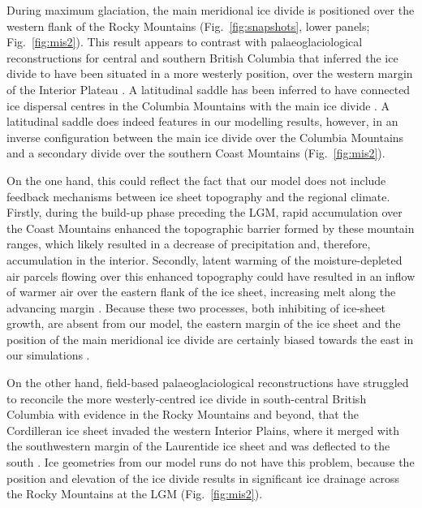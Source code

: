 \documentclass[tc, manuscript]{copernicus}
\begin{document}
During maximum glaciation, the main meridional ice divide is positioned over
the western flank of the Rocky Mountains (Fig.~\ref{fig:snapshots}, lower
panels; Fig.~\ref{fig:mis2}). This result appears to contrast with
palaeoglaciological reconstructions for central and southern British Columbia
that inferred the ice divide to have been situated in a more westerly position,
over the western margin of the Interior Plateau \citep{Ryder.etal.1991,
Stumpf.etal.2000, Kleman.etal.2010, Clague.Ward.2011, Margold.etal.2013a}. A
latitudinal saddle has been inferred to have connected ice dispersal centres in
the Columbia Mountains with the main ice divide \citep{Ryder.etal.1991,
Kleman.etal.2010, Clague.Ward.2011, Margold.etal.2013a}. A latitudinal saddle
does indeed features in our modelling results, however, in an inverse
configuration between the main ice divide over the Columbia Mountains and a
secondary divide over the southern Coast Mountains (Fig.~\ref{fig:mis2}).

On the one hand, this could reflect the fact that our model does not include
feedback mechanisms between ice sheet topography and the regional climate.
Firstly, during the build-up phase preceding the LGM, rapid accumulation over
the Coast Mountains enhanced the topographic barrier formed by these mountain
ranges, which likely resulted in a decrease of precipitation and, therefore,
accumulation in the interior. Secondly, latent warming of the moisture-depleted
air parcels flowing over this enhanced topography could have resulted in an
inflow of warmer air over the eastern flank of the ice sheet, increasing melt
along the advancing margin \citep[cf.][]{Langen.etal.2012}. Because these two
processes, both inhibiting of ice-sheet growth, are absent from our model, the
eastern margin of the ice sheet and the position of the main meridional ice
divide are certainly biased towards the east in our simulations
\citep{Seguinot.etal.2014}.

On the other hand, field-based palaeoglaciological reconstructions have
struggled to reconcile the more westerly-centred ice divide in south-central
British Columbia with evidence in the Rocky Mountains and beyond, that the
Cordilleran ice sheet invaded the western Interior Plains, where it merged with
the southwestern margin of the Laurentide ice sheet and was deflected to the
south \citep{Jackson.etal.1997, Bednarski.Smith.2007, Kleman.etal.2010,
Margold.etal.2013, Margold.etal.2013a}. Ice geometries from our model runs do
not have this problem, because the position and elevation of the ice divide
results in significant ice drainage across the Rocky Mountains at the LGM
(Fig.~\ref{fig:mis2}).
\end{document}
